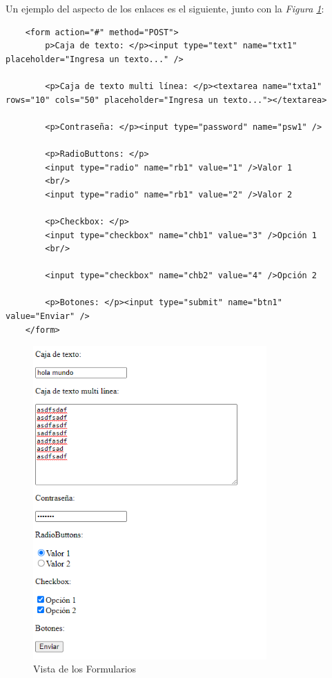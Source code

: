 Un ejemplo del aspecto de los enlaces es el siguiente, junto con la \textit{Figura \ref{fig: 8}}:
\begin{lstlisting}
    <form action="#" method="POST">
        p>Caja de texto: </p><input type="text" name="txt1" placeholder="Ingresa un texto..." />
        
        <p>Caja de texto multi línea: </p><textarea name="txta1" rows="10" cols="50" placeholder="Ingresa un texto..."></textarea>
        
        <p>Contraseña: </p><input type="password" name="psw1" />
        
        <p>RadioButtons: </p>
        <input type="radio" name="rb1" value="1" />Valor 1
        <br/>
        <input type="radio" name="rb1" value="2" />Valor 2
        
        <p>Checkbox: </p>
        <input type="checkbox" name="chb1" value="3" />Opción 1
        <br/>
        
        <input type="checkbox" name="chb2" value="4" />Opción 2
        
        <p>Botones: </p><input type="submit" name="btn1" value="Enviar" />
    </form>
\end{lstlisting}
\begin{figure}[H]
    \centering
    \caption{Vista de los Formularios}
    \label{fig: 8}
    \includegraphics[height=12cm]{ss_html/formularios.png}
\end{figure}

